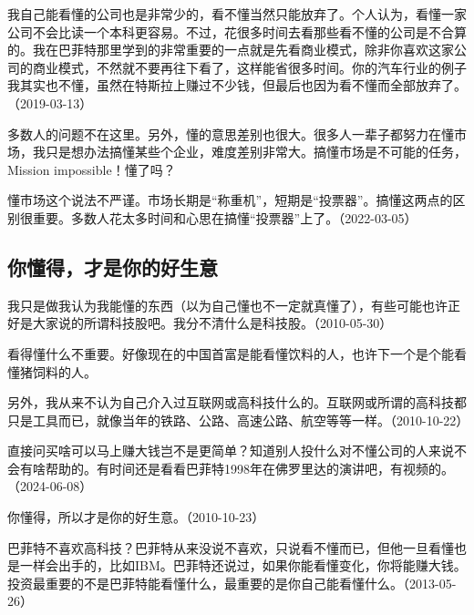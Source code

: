 
我自己能看懂的公司也是非常少的，看不懂当然只能放弃了。个人认为，看懂一家公司不会比读一个本科更容易。不过，花很多时间去看那些看不懂的公司是不合算的。我在巴菲特那里学到的非常重要的一点就是先看商业模式，除非你喜欢这家公司的商业模式，不然就不要再往下看了，这样能省很多时间。你的汽车行业的例子我其实也不懂，虽然在特斯拉上赚过不少钱，但最后也因为看不懂而全部放弃了。（2019-03-13）


多数人的问题不在这里。另外，懂的意思差别也很大。很多人一辈子都努力在懂市场，我只是想办法搞懂某些个企业，难度差别非常大。搞懂市场是不可能的任务，Mission impossible！懂了吗？

懂市场这个说法不严谨。市场长期是“称重机”，短期是“投票器”。搞懂这两点的区别很重要。多数人花太多时间和心思在搞懂“投票器”上了。（2022-03-05）

\subsection{你懂得，才是你的好生意}


我只是做我认为我能懂的东西（以为自己懂也不一定就真懂了），有些可能也许正好是大家说的所谓科技股吧。我分不清什么是科技股。（2010-05-30）

看得懂什么不重要。好像现在的中国首富是能看懂饮料的人，也许下一个是个能看懂猪饲料的人。

另外，我从来不认为自己介入过互联网或高科技什么的。互联网或所谓的高科技都只是工具而已，就像当年的铁路、公路、高速公路、航空等等一样。（2010-10-22）


直接问买啥可以马上赚大钱岂不是更简单？知道别人投什么对不懂公司的人来说不会有啥帮助的。有时间还是看看巴菲特1998年在佛罗里达的演讲吧，有视频的。（2024-06-08）

你懂得，所以才是你的好生意。（2010-10-23）


巴菲特不喜欢高科技？巴菲特从来没说不喜欢，只说看不懂而已，但他一旦看懂也是一样会出手的，比如IBM。巴菲特还说过，如果你能看懂变化，你将能赚大钱。投资最重要的不是巴菲特能看懂什么，最重要的是你自己能看懂什么。（2013-05-26）

